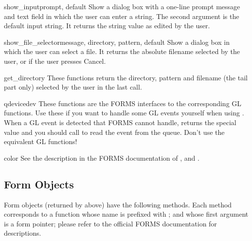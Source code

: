 \begin{funcdesc}{show_input}{prompt, default}
Show a dialog box with a one-line prompt message and text field in
which the user can enter a string.  The second argument is the default
input string.  It returns the string value as edited by the user.
\end{funcdesc}

\begin{funcdesc}{show_file_selector}{message, directory, pattern, default}
Show a dialog box in which the user can select a file.  It returns
the absolute filename selected by the user, or  if the user
presses Cancel.
\end{funcdesc}

\begin{funcdesc}{get_directory}{}
These functions return the directory, pattern and filename (the tail
part only) selected by the user in the last
 call.
\end{funcdesc}

\begin{funcdesc}{qdevice}{dev}
These functions are the FORMS interfaces to the corresponding GL
functions.  Use these if you want to handle some GL events yourself
when using .  When a GL event is detected that
FORMS cannot handle,  returns the special value
 and you should call  to read
the event from the queue.  Don't use the equivalent GL functions!
\end{funcdesc}

\begin{funcdesc}{color}{}
See the description in the FORMS documentation of
,  and
.
\end{funcdesc}

\subsection{Form Objects}
\label{form-objects}

Form objects (returned by  above) have the
following methods.  Each method corresponds to a \C{} function whose
name is prefixed with ; and whose first argument is a form
pointer; please refer to the official FORMS documentation for
descriptions.

